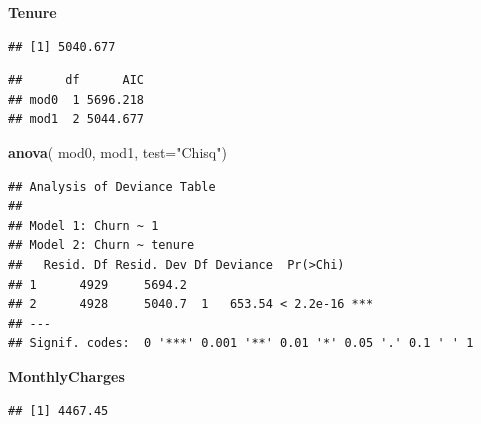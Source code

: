 \documentclass[
  twoside]{article}
\newenvironment{Shaded}{\begin{snugshade}}{\end{snugshade}}
\newcommand{\AttributeTok}[1]{\textcolor[rgb]{0.13,0.29,0.53}{#1}}
\newcommand{\CommentTok}[1]{\textcolor[rgb]{0.56,0.35,0.01}{\textit{#1}}}
\newcommand{\FunctionTok}[1]{\textcolor[rgb]{0.13,0.29,0.53}{\textbf{#1}}}
\newcommand{\NormalTok}[1]{#1}
\newcommand{\OtherTok}[1]{\textcolor[rgb]{0.56,0.35,0.01}{#1}}
\newcommand{\SpecialCharTok}[1]{\textcolor[rgb]{0.81,0.36,0.00}{\textbf{#1}}}
\newcommand{\StringTok}[1]{\textcolor[rgb]{0.31,0.60,0.02}{#1}}
\begin{document}
\textbf{Tenure}

\begin{Shaded}
\end{Shaded}

\begin{verbatim}
## [1] 5040.677
\end{verbatim}

\begin{verbatim}
##      df      AIC
## mod0  1 5696.218
## mod1  2 5044.677
\end{verbatim}

\begin{Shaded}
\begin{Highlighting}[]
\FunctionTok{anova}\NormalTok{( mod0, mod1,  }\AttributeTok{test=}\StringTok{"Chisq"}\NormalTok{)}
\end{Highlighting}
\end{Shaded}

\begin{verbatim}
## Analysis of Deviance Table
## 
## Model 1: Churn ~ 1
## Model 2: Churn ~ tenure
##   Resid. Df Resid. Dev Df Deviance  Pr(>Chi)    
## 1      4929     5694.2                          
## 2      4928     5040.7  1   653.54 < 2.2e-16 ***
## ---
## Signif. codes:  0 '***' 0.001 '**' 0.01 '*' 0.05 '.' 0.1 ' ' 1
\end{verbatim}

\textbf{MonthlyCharges}

\begin{Shaded}
\end{Shaded}

\begin{verbatim}
## [1] 4467.45
\end{verbatim}
\end{document}
